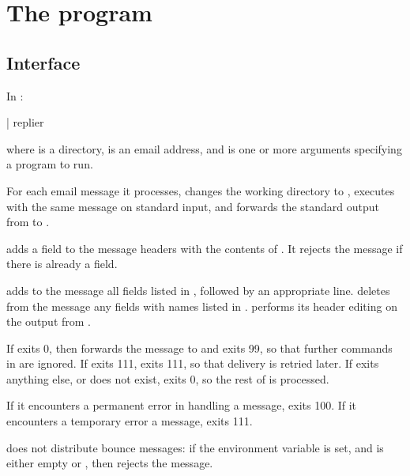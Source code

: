 
\chapter{The  program}

\section{Interface}
In :
\begin{code}
  | replier   
\end{code}
where  is a directory,  is an email address,
and  is one or more arguments specifying a program to run.

For each email message it processes,  changes the working
directory to , executes  with the same message on
standard input, and forwards the standard output from  to
.

 adds a  field to the message
headers with the contents of .  It rejects the
message if there is already a  field.

 adds to the message all fields listed in
, followed by an appropriate
 line.   deletes from the message
any fields with names listed in .
 performs its header editing on the output from
.

If  exits 0, then  forwards the message to
 and exits 99, so that further commands in 
are ignored.  If  exits 111,  exits 111, so
that delivery is retried later.  If  exits anything else, or
does not exist,  exits 0, so the rest of
 is processed.

If it encounters a permanent error in handling a message,
 exits 100.  If it encounters a temporary error a
message,  exits 111.


 does not distribute bounce messages: if the environment
variable  is set, and is either empty or ,
then  rejects the message.

